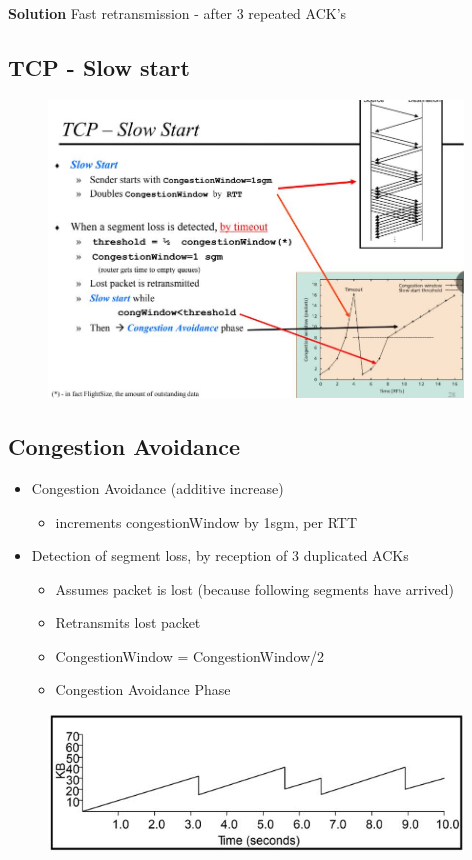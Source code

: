 \documentclass[../resumosRCOM.tex]{subfiles}
\begin{document}
\textbf{Solution}
Fast retransmission - after 3 repeated ACK's

\subsection{TCP - Slow start}
\begin{figure}[h]
    \centering
    \includegraphics[width=11cm]{images/trans13.JPG}
\end{figure}

\subsection{Congestion Avoidance}
\begin{itemize}
    \item Congestion Avoidance (additive increase)
    \begin{itemize}
        \item increments congestionWindow by 1sgm, per RTT
    \end{itemize}
    \item Detection of segment loss, by reception of 3 duplicated ACKs
    \begin{itemize}
        \item Assumes packet is lost (because following segments have arrived)
        \item Retransmits lost packet
        \item CongestionWindow = CongestionWindow/2
        \item Congestion Avoidance Phase
    \end{itemize}
\end{itemize}
\begin{figure}[h]
    \centering
    \includegraphics[width=11cm]{images/trans14.JPG}
\end{figure}
\end{document}
